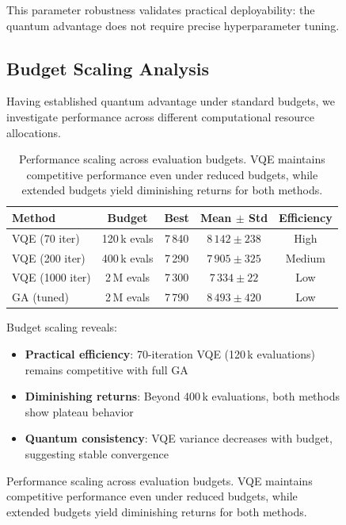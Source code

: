 \begin{figure}[htb]
This parameter robustness validates practical deployability: the quantum advantage does not require precise hyperparameter tuning.

\subsection{Budget Scaling Analysis}

Having established quantum advantage under standard budgets, we investigate performance across different computational resource allocations.


\begin{table}[htb]
    \centering
    \caption{Performance scaling across evaluation budgets. VQE maintains competitive performance even under reduced budgets, while extended budgets yield diminishing returns for both methods.}
    \label{tab:budget_scaling}
    \begin{tabular}{lcccc}
        \toprule
        Method & Budget & Best & Mean $\pm$ Std & Efficiency \\
        \midrule
        VQE (70 iter) & 120\,k evals & 7\,840 & $8\,142 \pm 238$ & High \\
        VQE (200 iter) & 400\,k evals & 7\,290 & $7\,905 \pm 325$ & Medium \\
        VQE (1000 iter) & 2\,M evals & 7\,300 & $7\,334 \pm 22$ & Low \\
        GA (tuned) & 2\,M evals & 7\,790 & $8\,493 \pm 420$ & Low \\
        \bottomrule
    \end{tabular}
\end{table}

Budget scaling reveals:
\begin{itemize}[nosep]
    \item \textbf{Practical efficiency}: 70-iteration VQE (120\,k evaluations) remains competitive with full GA
    \item \textbf{Diminishing returns}: Beyond 400\,k evaluations, both methods show plateau behavior
    \item \textbf{Quantum consistency}: VQE variance decreases with budget, suggesting stable convergence
\end{itemize}


\end{figure}
